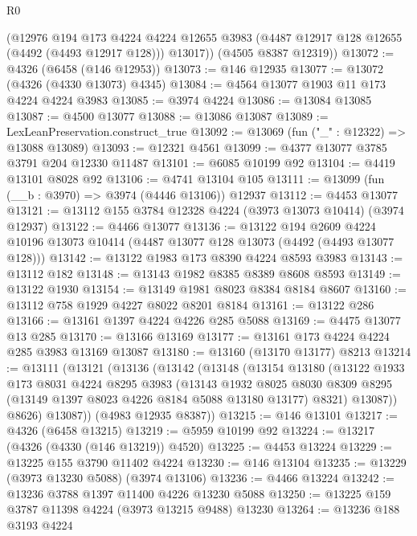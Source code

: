 \begin{lexlean}{R0}
\begin{coremodule}
        (@12976
          @194
          @173
          @4224
          @4224
          @12655
          @3983
          (@4487 @12917 @128 @12655 (@4492 (@4493 @12917 @128)))
          @13017))
      (@4505 @8387 @12319))
@13072 := @4326 (@6458 (@146 @12953))
@13073 := @146 @12935
@13077 := @13072 (@4326 (@4330 @13073) @4345)
@13084 := @4564 @13077 @1903 @11 @173 @4224 @4224 @3983
@13085 := @3974 @4224
@13086 := @13084 @13085
@13087 := @4500 @13077
@13088 := @13086 @13087
@13089 := LexLeanPreservation.construct_true
@13092 := @13069 (fun ("_" : @12322) => @13088 @13089)
@13093 := @12321 @4561
@13099 := @4377 @13077 @3785 @3791 @204 @12330 @11487
@13101 := @6085 @10199 @92
@13104 := @4419 @13101 @8028 @92
@13106 := @4741 @13104 @105
@13111 := @13099 (fun (__b : @3970) => @3974 (@4446 @13106)) @12937
@13112 := @4453 @13077
@13121 := @13112 @155 @3784 @12328 @4224 (@3973 @13073 @10414) (@3974 @12937)
@13122 := @4466 @13077
@13136 := @13122
    @194
    @2609
    @4224
    @10196
    @13073
    @10414
    (@4487 @13077 @128 @13073 (@4492 (@4493 @13077 @128)))
@13142 := @13122 @1983 @173 @8390 @4224 @8593 @3983
@13143 := @13112 @182
@13148 := @13143 @1982 @8385 @8389 @8608 @8593
@13149 := @13122 @1930
@13154 := @13149 @1981 @8023 @8384 @8184 @8607
@13160 := @13112 @758 @1929 @4227 @8022 @8201 @8184
@13161 := @13122 @286
@13166 := @13161 @1397 @4224 @4226 @285 @5088
@13169 := @4475 @13077 @13 @285
@13170 := @13166 @13169
@13177 := @13161 @173 @4224 @4224 @285 @3983 @13169 @13087
@13180 := @13160 (@13170 @13177) @8213
@13214 := @13111
    (@13121
      (@13136
        (@13142
          (@13148
            (@13154
              @13180
              (@13122
                @1933
                @173
                @8031
                @4224
                @8295
                @3983
                (@13143
                  @1932
                  @8025
                  @8030
                  @8309
                  @8295
                  (@13149 @1397 @8023 @4226 @8184 @5088 @13180 @13177)
                  @8321)
                @13087))
            @8626)
          @13087))
      (@4983 @12935 @8387))
@13215 := @146 @13101
@13217 := @4326 (@6458 @13215)
@13219 := @5959 @10199 @92
@13224 := @13217 (@4326 (@4330 (@146 @13219)) @4520)
@13225 := @4453 @13224
@13229 := @13225 @155 @3790 @11402 @4224
@13230 := @146 @13104
@13235 := @13229 (@3973 @13230 @5088) (@3974 @13106)
@13236 := @4466 @13224
@13242 := @13236 @3788 @1397 @11400 @4226 @13230 @5088
@13250 := @13225 @159 @3787 @11398 @4224 (@3973 @13215 @9488) @13230
@13264 := @13236
    @188
    @3193
    @4224

\end{coremodule}
\end{lexlean}
